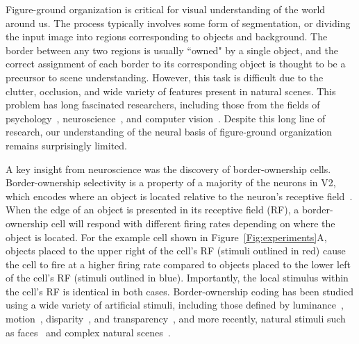 \documentclass[12pt]{article}
\begin{document}
Figure-ground organization is critical for visual understanding of the world around us. The process typically involves some form of segmentation, or dividing the input image into regions corresponding to objects and background. The border between any two regions is usually ``owned" by a single object, and the correct assignment of each border to its corresponding object is thought to be a precursor to scene understanding.
However, this task is difficult due to the clutter, occlusion, and wide variety of features present in natural scenes. This problem has long fascinated researchers, including those from the fields of psychology~\citep{Wertheimer23,Koffka35}, neuroscience~\citep{Zhou_etal00,Craft_etal07}, and computer vision~\citep{Ren_etal06,Teo_etal15,Wang_Yuille16}.
Despite this long line of research, our understanding of the neural basis of figure-ground organization remains surprisingly limited.

A key insight from neuroscience was the discovery of border-ownership cells. Border-ownership selectivity is a property of a majority of the
neurons in V2, which encodes where an object is located relative to the
neuron's receptive field~\citep{Zhou_etal00}.
When the edge of an object is presented in its receptive field (RF), a border-ownership cell will respond with different firing rates depending on where the object is located.
For the example cell shown in Figure~\ref{Fig:experiments}A, objects placed to the upper right of the cell's RF (stimuli outlined in red) cause the cell to fire at a higher firing rate compared to objects placed to the lower left of the cell's RF (stimuli outlined in blue). Importantly, the local stimulus within the cell's RF is identical in both cases. Border-ownership coding has been studied using a wide variety of artificial stimuli, including those defined by luminance~\citep{Zhou_etal00}, motion~\citep{vonderHeydt_etal03a}, disparity~\citep{Qiu_vonderHeydt05}, and transparency~\citep{Qiu_vonderHeydt07}, and more recently, natural stimuli such as faces~\citep{Hesse_Tsao16} and complex natural scenes~\citep{Williford_vonderHeydt16}.
\end{document}
